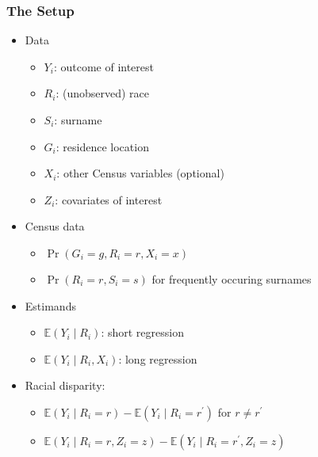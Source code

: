 \documentclass[handout]{beamer}
\newcommand\E{\mathbb{E}}
\begin{document}
\begin{frame}

\frametitle{The Setup}

\begin{itemize}
\item Data
  \begin{itemize}
  \item $Y_i$: outcome of interest 
  \item $R_i$: (unobserved) race
  \item $S_i$: surname
  \item $G_i$: residence location
  \item $X_i$: other Census variables (optional)
  \item $Z_i$: covariates of interest
  \end{itemize}
\item Census data
  \begin{itemize}
  \item $\Pr(G_i = g, R_i = r, X_i = x)$
  \item $\Pr(R_i = r, S_i =s)$ for frequently occuring surnames
  \end{itemize}

  \vfill
\item Estimands
  \begin{itemize}
  \item $\E(Y_i \mid R_i)$: short regression
  \item $\E(Y_i \mid R_i, X_i)$: long regression 
  \end{itemize}

\item Racial disparity:
  \begin{itemize}
  \item $\E(Y_i \mid R_i = r) - \E(Y_i \mid R_i = r^\prime)$ for $r
    \ne r^\prime$
  \item $\E(Y_i \mid R_i = r, Z_i = z) - \E(Y_i \mid R_i = r^\prime, Z_i = z)$
  \end{itemize}

\end{itemize}
  
\end{frame}
\end{document}
